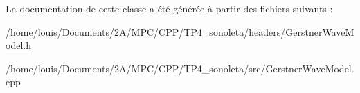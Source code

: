La documentation de cette classe a été générée à partir des fichiers suivants \+:\begin{DoxyCompactItemize}
\item 
/home/louis/\+Documents/2\+A/\+M\+P\+C/\+C\+P\+P/\+T\+P4\+\_\+sonoleta/headers/\hyperlink{_gerstner_wave_model_8h}{Gerstner\+Wave\+Model.\+h}\item 
/home/louis/\+Documents/2\+A/\+M\+P\+C/\+C\+P\+P/\+T\+P4\+\_\+sonoleta/src/Gerstner\+Wave\+Model.\+cpp\end{DoxyCompactItemize}
